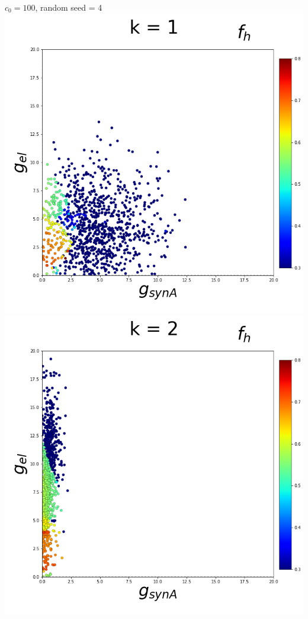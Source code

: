 \documentclass[11pt]{article}
\begin{document}
\begin{center}
{\Large $c_0 = 100$, random seed = 4} \\
\includegraphics[scale=0.125]{DSN_figs/STGCircuit_DSN_c=2_rs=4_k=1.png}
\includegraphics[scale=0.125]{DSN_figs/STGCircuit_DSN_c=2_rs=4_k=2.png}

\end{center}
\end{document}
